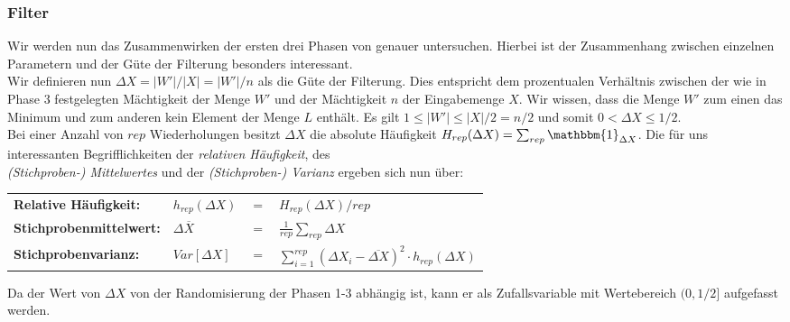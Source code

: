 \subsubsection{Filter}		%

\noindent
Wir werden nun das Zusammenwirken der ersten drei Phasen von \Rm genauer untersuchen. Hierbei ist der Zusammenhang zwischen einzelnen Parametern und der Güte der Filterung besonders interessant.\\[.1cm]

\noindent
Wir definieren nun $\Delta X=|W'|/|X|=|W'|/n$ als die Güte der Filterung. Dies entspricht dem prozentualen Verhältnis zwischen der wie in Phase 3 festgelegten Mächtigkeit der Menge $W'$ und der Mächtigkeit $n$ der Eingabemenge $X$. Wir wissen, dass die Menge $W'$ zum einen das Minimum und zum anderen kein Element der Menge $L$ enthält. Es gilt $1 \leq |W'| \leq |X|/2=n/2$ und somit $0 < \Delta X \leq 1/2$. \\[.05cm]

\noindent
Bei einer Anzahl von $rep$ Wiederholungen besitzt $\Delta X$ die absolute Häufigkeit $H_{rep}(\Delta X)= \sum_{rep} \mathbbm{1}_{\Delta X}$. Die für uns interessanten Begrifflichkeiten der \textit{relativen Häufigkeit}, des \\
\textit{(Stichproben-) Mittelwertes} und der \textit{(Stichproben-) Varianz} ergeben sich nun über:
\begin{center}
\begin{tabular}{llcl}
\textbf{Relative Häufigkeit:}&$h_{rep}(\Delta X)$& $=$& $H_{rep}(\Delta X) / rep$\\[.25cm]
\textbf{Stichprobenmittelwert:}&$\Delta\overline{X}$& $=$ & $\frac{1}{rep}\sum_{rep} \Delta X$\\[.25cm]
\textbf{Stichprobenvarianz:}&$Var[\Delta X]$ & $=$ & $\sum\limits_{i=1}^{rep} (\Delta X_i - \overline{\Delta X})^2 \cdot h_{rep}(\Delta X)$
\end{tabular}
\end{center}

\noindent
Da der Wert von $\Delta X$ von der Randomisierung der Phasen 1-3 abhängig ist, kann er als Zufallsvariable mit Wertebereich $(0,1/2]$ aufgefasst werden.\\[.05cm]


